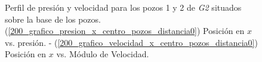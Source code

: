 \documentclass[10pt,a4paper,final]{article}
\begin{document}
\begin{figure}[H]
   \centering
   \hspace{0.1\linewidth}
    \caption{Perfil de presión y velocidad para los pozos 1 y 2 de \emph{G2} situados sobre la base de los pozos. (\ref{200_grafico_presion_x_centro_pozos_distancia0}) Posición en $x$ vs. presión. - (\ref{200_grafico_velocidad_x_centro_pozos_distancia0}) Posición en $x$ vs. Módulo de Velocidad.}
   \label{200_grafico_velocidad_presion_centro_pozos_distancia0}                %
\end{figure}
%
\end{document}
